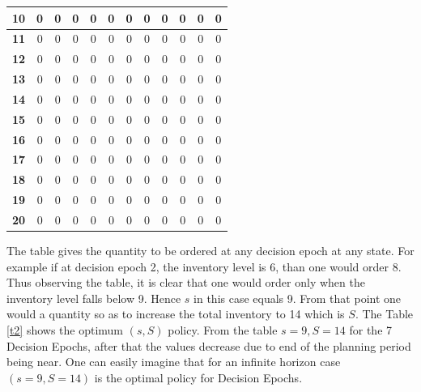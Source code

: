 \documentclass[11pt,a4paper,oneside]{report}
\begin{document}
\begin{table}[]
\begin{tabular}{|c|c|c|c|c|c|c|c|c|c|c|c|}
\textbf{10}      & 0          & 0          & 0          & 0          & 0          & 0          & 0          & 0          & 0          & 0          & 0           \\ \hline
\textbf{11}      & 0          & 0          & 0          & 0          & 0          & 0          & 0          & 0          & 0          & 0          & 0           \\ \hline
\textbf{12}      & 0          & 0          & 0          & 0          & 0          & 0          & 0          & 0          & 0          & 0          & 0           \\ \hline
\textbf{13}      & 0          & 0          & 0          & 0          & 0          & 0          & 0          & 0          & 0          & 0          & 0           \\ \hline
\textbf{14}      & 0          & 0          & 0          & 0          & 0          & 0          & 0          & 0          & 0          & 0          & 0           \\ \hline
\textbf{15}      & 0          & 0          & 0          & 0          & 0          & 0          & 0          & 0          & 0          & 0          & 0           \\ \hline
\textbf{16}      & 0          & 0          & 0          & 0          & 0          & 0          & 0          & 0          & 0          & 0          & 0           \\ \hline
\textbf{17}      & 0          & 0          & 0          & 0          & 0          & 0          & 0          & 0          & 0          & 0          & 0           \\ \hline
\textbf{18}      & 0          & 0          & 0          & 0          & 0          & 0          & 0          & 0          & 0          & 0          & 0           \\ \hline
\textbf{19}      & 0          & 0          & 0          & 0          & 0          & 0          & 0          & 0          & 0          & 0          & 0           \\ \hline
\textbf{20}      & 0          & 0          & 0          & 0          & 0          & 0          & 0          & 0          & 0          & 0          & 0           \\ \hline
\end{tabular}
\end{table}
The table gives the quantity to be ordered at any decision epoch at any state. For example if at decision epoch 2, the inventory level is 6, than one would order 8. Thus observing the table, it is clear that one would order only when the inventory level falls below 9. Hence $s$ in this case equals 9. From that point one would a quantity so as to increase the total inventory to 14 which is $S$. The Table \ref{t2} shows the optimum $(s,S)$ policy. From the table $s=9, S=14$ for the 7 Decision Epochs, after that the values decrease due to end of the planning period being near. One can easily imagine that for an infinite horizon case $(s=9, S=14)$ is the optimal policy for Decision Epochs.
\end{document}
